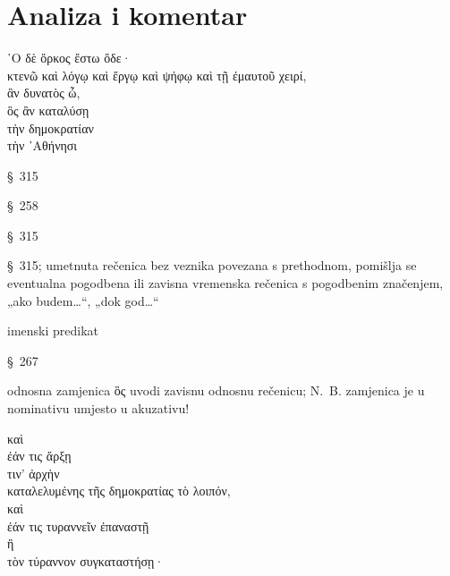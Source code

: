 \section*{Analiza i komentar}


{\large
\begin{greek}
\noindent ῾Ο δὲ ὅρκος ἔστω ὅδε·  \\
\tabto{2em} κτενῶ καὶ λόγῳ καὶ ἔργῳ καὶ ψήφῳ καὶ τῇ ἐμαυτοῦ χειρί, \\
\tabto{4em} ἂν δυνατὸς ὦ, \\
\tabto{2em} ὃς ἂν καταλύσῃ \\
\tabto{4em} τὴν δημοκρατίαν \\
\tabto{6em} τὴν ᾿Αθήνησι\\

\end{greek}
}

\begin{description}[noitemsep]
\item[ἔστω] §~315
\item[κτενῶ] §~258
\item[ὦ] §~315
\item[ἂν δυνατὸς ὦ] §~315; umetnuta rečenica bez veznika povezana s prethodnom, pomišlja se eventualna pogodbena ili zavisna vremenska rečenica s pogodbenim značenjem, „ako budem…“, „dok god…“
\item[δυνατὸς ὦ] imenski predikat
\item[καταλύσῃ] §~267
\item[ὃς ἂν καταλύσῃ] odnosna zamjenica ὃς uvodi zavisnu odnosnu rečenicu; N.~B. zamjenica je u nominativu umjesto u akuzativu!

\end{description}

{\large
\begin{greek}
\noindent καὶ \\
\tabto{2em} ἐάν τις ἄρξῃ \\
\tabto{4em} τιν' ἀρχὴν \\
\tabto{2em} καταλελυμένης τῆς δημοκρατίας τὸ λοιπόν,\\
καὶ \\
\tabto{2em} ἐάν τις τυραννεῖν ἐπαναστῇ \\
\tabto{2em} ἢ \\
\tabto{2em} τὸν τύραννον συγκαταστήσῃ·\\

\end{greek}
}

